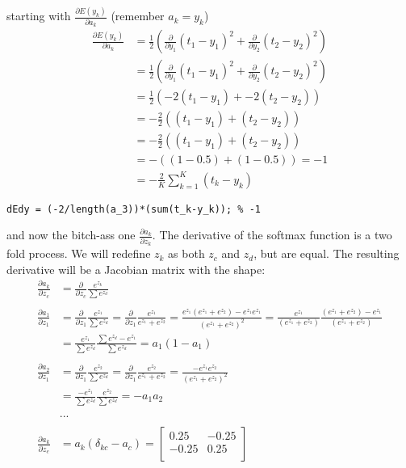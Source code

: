 \documentclass{article}
\begin{document}
starting with $\frac{\partial E(y_k)}{\partial a_k} $ (remember $a_k = y_k$)
\begin{align*}
    \frac{\partial E(y_k)}{\partial a_k} 
    &= \frac{1}{2}\left(\frac{\partial}{\partial y_1}(t_1 - y_1)^2 +\frac{\partial}{\partial y_2}(t_2 - y_2)^2\right)\\
    &= \frac{1}{2}\left(\frac{\partial}{\partial y_1}(t_1 - y_1)^2 +\frac{\partial}{\partial y_2}(t_2 - y_2)^2\right)\\
    &= \frac{1}{2}(-2(t_1 - y_1) +-2(t_2 - y_2))\\
    &= -\frac{2}{2}((t_1 - y_1) +(t_2 - y_2))\\
    &= -\frac{2}{2}((t_1 - y_1) +(t_2 - y_2))\\
    &= -((1 - 0.5) + (1 - 0.5)) = -1\\
    &= -\frac{2}{K}\sum^K_{k=1} (t_k-y_k)
\end{align*}
\begin{lstlisting}[style=matlab, label=your-label]
dEdy = (-2/length(a_3))*(sum(t_k-y_k)); % -1
\end{lstlisting}

and now the bitch-ass one $\frac{\partial a_k}{\partial z_k}$. The derivative of the softmax function is a two fold process. We will redefine $z_k$ as both $z_c$ and $z_d$, but are equal. The resulting derivative will be a Jacobian matrix with the shape:
\begin{align*}
\frac{\partial a_k}{\partial z_c} 
    &= \frac{\partial}{\partial z_c}\frac{e^{z_k}}{\sum e^{z_d}}\\ \\
\frac{\partial a_1}{\partial z_1} 
    &= \frac{\partial}{\partial z_1}\frac{e^{z_1}}{\sum e^{z_d}}
     = \frac{\partial}{\partial z_1}\frac{e^{z_1}}{e^{z_1}+e^{z_2}} 
     = \frac{e^{z_1}(e^{z_1}+e^{z_2})-e^{z_1}e^{z_1}}{(e^{z_1}+e^{z_2})^2}
     = \frac{e^{z_1}}{(e^{z_1}+e^{z_2})}\frac{(e^{z_1}+e^{z_2})-e^{z_1}}{(e^{z_1}+e^{z_2})}\\
    &= \frac{e^{z_1}}{\sum e^{z_d}}\frac{\sum e^{z_d} - e^{z_1}}{\sum e^{z_d}} = a_1(1-a_1)\\ \\
\frac{\partial a_2}{\partial z_1}
    &= \frac{\partial}{\partial z_1}\frac{e^{z_2}}{\sum e^{z_d}}
     = \frac{\partial}{\partial z_1}\frac{e^{z_2}}{e^{z_1}+e^{z_2}}
     = \frac{-e^{z_1}e^{z_2}}{(e^{z_1}+e^{z_2})^2} \\
     &= \frac{-e^{z_1}}{\sum e^{z_d}}\frac{e^{z_2}}{\sum e^{z_d}} = -a_1a_2\\ \\
     &. . . \\ \\
\frac{\partial a_k}{\partial z_c} &=
a_k(\delta_{kc} - a_c) = \begin{bmatrix}
    0.25& -0.25\\
    -0.25& 0.25\\
\end{bmatrix}
\end{align*}
\end{document}

